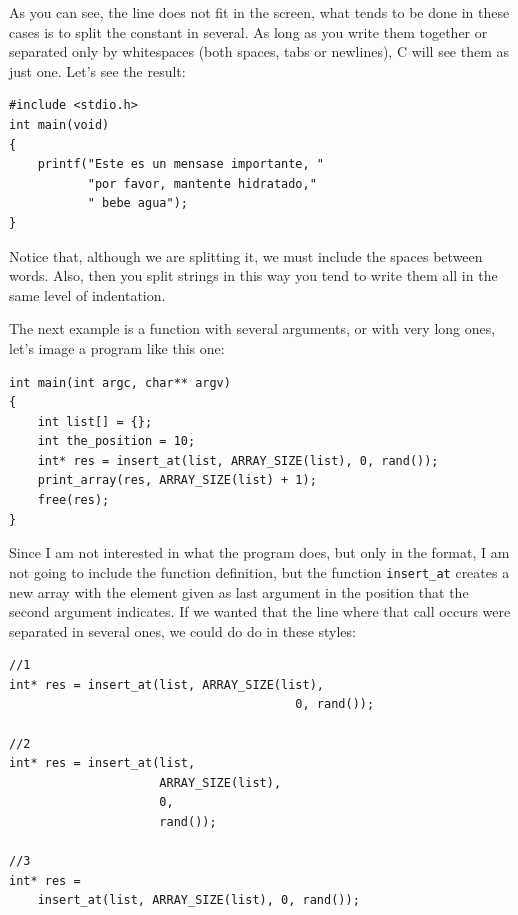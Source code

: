 \documentclass[a4paper]{article}
\begin{document}
As you can see, the line does not fit in the screen, what tends to be done in
these cases is to split the constant in several. As long as you write them
together or separated only by whitespaces (both spaces, tabs or newlines), C
will see them as just one. Let's see the result:

\noindent
\begin{minipage}[H]{\linewidth}
\mbox{}
\begin{lstlisting}[style=C,
caption={Splitting a long printing instruction},
label={lst:longprint}]
#include <stdio.h>
int main(void)
{
    printf("Este es un mensase importante, "
           "por favor, mantente hidratado,"
           " bebe agua");
}
\end{lstlisting}
\end{minipage}

Notice that, although we are splitting it, we must include the spaces between
words. Also, then you split strings in this way you tend to write them all
in the same level of indentation.

The next example is a function with several arguments, or with very long ones,
let's image a program like this one:

\noindent
\begin{minipage}[H]{\linewidth}
\mbox{}
\begin{lstlisting}[style=C,
caption={Example of a call with several arguments},
label={lst:manyArgs}]
int main(int argc, char** argv)
{
    int list[] = {};
    int the_position = 10;
    int* res = insert_at(list, ARRAY_SIZE(list), 0, rand());
    print_array(res, ARRAY_SIZE(list) + 1);
    free(res);
}
\end{lstlisting}
\end{minipage}

Since I am not interested in what the program does, but only in the format, I am
not going to include the function definition, but the function \verb!insert_at!
creates a new array with the element given as last argument in the position that
the second argument indicates. If we wanted that the line where that call occurs
were separated in several ones, we could do do in these styles:

\noindent
\begin{minipage}[H]{\linewidth}
\mbox{}
\begin{lstlisting}[style=C,
caption={Splitting of call with several arguments},
label={lst:manyArgsShorting}]
//1
int* res = insert_at(list, ARRAY_SIZE(list),
                                        0, rand());

//2
int* res = insert_at(list,
                     ARRAY_SIZE(list),
                     0,
                     rand());

//3
int* res =
    insert_at(list, ARRAY_SIZE(list), 0, rand());
\end{lstlisting}
\end{minipage}
\end{document}
